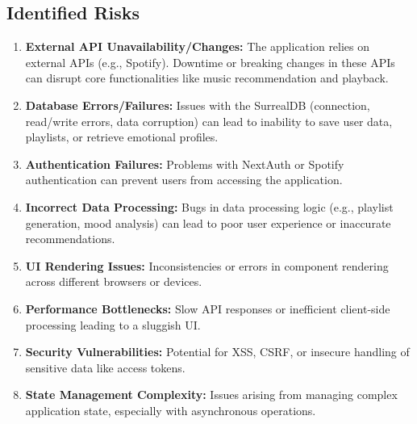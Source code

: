\documentclass{article}
\begin{document}
\subsection{Identified Risks}
\begin{enumerate}[label=\textbf{R\arabic*.}, itemsep=5pt]
    \item \textbf{External API Unavailability/Changes:} The application relies on external APIs (e.g., Spotify). Downtime or breaking changes in these APIs can disrupt core functionalities like music recommendation and playback.
    \item \textbf{Database Errors/Failures:} Issues with the SurrealDB (connection, read/write errors, data corruption) can lead to inability to save user data, playlists, or retrieve emotional profiles.
    \item \textbf{Authentication Failures:} Problems with NextAuth or Spotify authentication can prevent users from accessing the application.
    \item \textbf{Incorrect Data Processing:} Bugs in data processing logic (e.g., playlist generation, mood analysis) can lead to poor user experience or inaccurate recommendations.
    \item \textbf{UI Rendering Issues:} Inconsistencies or errors in component rendering across different browsers or devices.
    \item \textbf{Performance Bottlenecks:} Slow API responses or inefficient client-side processing leading to a sluggish UI.
    \item \textbf{Security Vulnerabilities:} Potential for XSS, CSRF, or insecure handling of sensitive data like access tokens.
    \item \textbf{State Management Complexity:} Issues arising from managing complex application state, especially with asynchronous operations.
\end{enumerate}
\end{document}
